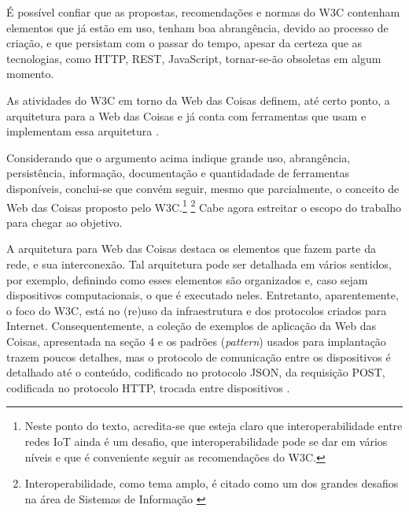 É possível confiar que as propostas, recomendações e normas do W3C contenham elementos que já estão em uso, tenham boa abrangência, devido ao processo de criação, e que persistam com o passar do tempo, apesar da certeza que as tecnologias, como HTTP, REST, JavaScript, tornar-se-ão obsoletas em algum momento. 

As atividades do W3C em torno da Web das Coisas definem, até certo ponto, a arquitetura para a Web das Coisas  \cite{Matsukura:23:WTA} e já conta com ferramentas que usam e implementam essa arquitetura \cite{WoTDevTools}.

Considerando que o argumento acima indique grande uso, abrangência, persistência, informação, documentação e quantidadade de ferramentas disponíveis, conclui-se que convém seguir, mesmo que parcialmente, o conceito de Web das Coisas proposto pelo W3C.\footnote{Neste ponto do texto, acredita-se que esteja claro que interoperabilidade entre redes IoT ainda é um desafio, que interoperabilidade pode se dar em vários níveis e que é conveniente seguir as recomendações do W3C.}
\footnote{Interoperabilidade, como tema amplo, é citado como um dos grandes desafios na área de Sistemas de Informação \cite{grandsi}} Cabe agora estreitar o escopo do trabalho para chegar ao objetivo.







A arquitetura para Web das Coisas \cite{Matsukura:23:WTA} destaca os elementos que fazem parte da rede, e sua interconexão. Tal arquitetura pode ser detalhada em vários sentidos, por exemplo, definindo como esses elementos são organizados e, caso sejam dispositivos computacionais, o que é executado neles. Entretanto, aparentemente, o foco do W3C, está no (re)uso da infraestrutura e dos protocolos criados para Internet. Consequentemente, a coleção de exemplos de aplicação da Web das Coisas, apresentada na seção 4 e os padrões (\textit{pattern}) usados para implantação trazem poucos detalhes, mas o protocolo de comunicação entre os dispositivos é detalhado até o conteúdo, codificado no protocolo JSON, da requisição POST, codificada no protocolo HTTP, trocada entre dispositivos \cite{McCool:23:WTT}.

